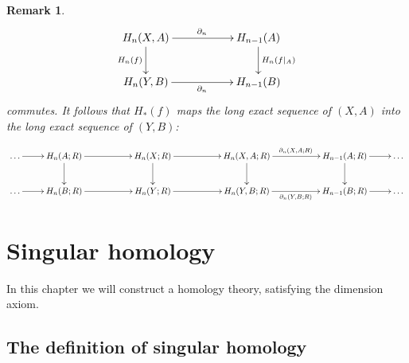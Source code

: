 \documentclass[11pt]{book}
\numberwithin{dummy}{section}
\newtheorem{remark}[theorem]{Remark}
\theoremstyle{nonumberbreak}
\begin{document}
\begin{spacing}{1.4}
\begin{remark}
$$
\begin{xy}
\xymatrix{
H_n(X,A) \ar[rr]^{\partial_n} \ar[d]_{H_n(f)} && H_{n-1}(A) \ar[d]^{H_n(f\vert_A)} \\ H_n(Y,B) \ar[rr]_{\partial_n} && H_{n-1}(B)
}
\end{xy}
$$
commutes. It follows that $H_*(f)$ maps the long exact sequence of $(X,A)$ into the long exact sequence of $(Y,B)$:

$$
\begin{xy}
\xymatrix{
\ldots \ar[r] & H_n(A;R) \ar[d] \ar[rr] && H_n(X;R) \ar[d] \ar[rr] && H_n(X,A;R) \ar[d] \ar[rr]^{\partial_n(X,A;R)} && H_{n-1}(A;R) \ar[d] \ar[r] & \ldots \\
\ldots \ar[r] & H_n(B;R) \ar[rr] && H_n(Y;R) \ar[rr] && H_n(Y,B;R) \ar[rr]_{\partial_n(Y,B;R)} && H_{n-1}(B;R) \ar[r] & \ldots
}
\end{xy}
$$

\end{remark}


\newpage
\thispagestyle{empty}




































\chapter{Singular homology} %
\setlength\abovedisplayshortskip{0pt}
\setlength\belowdisplayshortskip{10pt}
\setlength\abovedisplayskip{10pt}
\setlength\belowdisplayskip{10pt}




In this chapter we will construct a homology theory, satisfying the dimension axiom.


\section{The definition of singular homology} %


\end{spacing}
\end{document}
